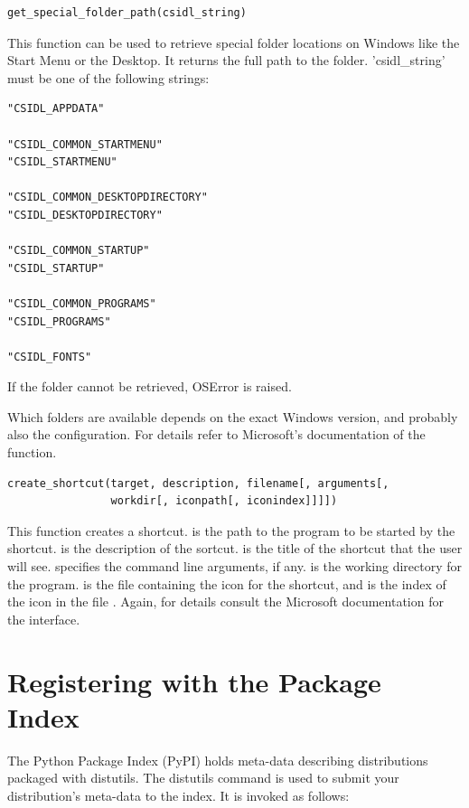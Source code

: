 \documentclass{howto}
\begin{document}
\begin{verbatim}
get_special_folder_path(csidl_string)
\end{verbatim}

This function can be used to retrieve special folder locations on
Windows like the Start Menu or the Desktop.  It returns the full path
to the folder.  'csidl_string' must be one of the following strings:

\begin{verbatim}
"CSIDL_APPDATA"

"CSIDL_COMMON_STARTMENU"
"CSIDL_STARTMENU"

"CSIDL_COMMON_DESKTOPDIRECTORY"
"CSIDL_DESKTOPDIRECTORY"

"CSIDL_COMMON_STARTUP"
"CSIDL_STARTUP"

"CSIDL_COMMON_PROGRAMS"
"CSIDL_PROGRAMS"

"CSIDL_FONTS"
\end{verbatim}

If the folder cannot be retrieved, OSError is raised.

Which folders are available depends on the exact Windows version, and probably
also the configuration. For details refer to Microsoft's documentation of the
 function.

\begin{verbatim}
create_shortcut(target, description, filename[, arguments[,
                workdir[, iconpath[, iconindex]]]])
\end{verbatim}

This function creates a shortcut.
 is the path to the program to be started by the shortcut.
 is the description of the sortcut.
 is the title of the shortcut that the user will see.
 specifies the command line arguments, if any.
 is the working directory for the program.
 is the file containing the icon for the shortcut,
and  is the index of the icon in the file
.  Again, for details consult the Microsoft
documentation for the  interface.

\section{Registering with the Package Index}
\label{package-index}

The Python Package Index (PyPI) holds meta-data describing distributions
packaged with distutils. The distutils command  is
used to submit your distribution's meta-data to the index. It is invoked
as follows:
\end{document}
